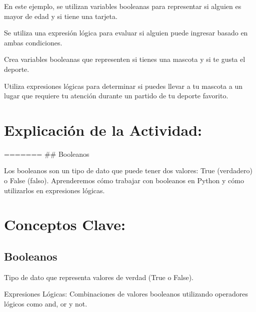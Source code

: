 \documentclass[
  a4paper,
  DIV=11,
  numbers=noendperiod,
  onepage,
  openany]{scrreprt}
\begin{document}
En este ejemplo, se utilizan variables booleanas para representar si
alguien es mayor de edad y si tiene una tarjeta.

Se utiliza una expresión lógica para evaluar si alguien puede ingresar
basado en ambas condiciones.

\begin{tcolorbox}[enhanced jigsaw, colbacktitle=quarto-callout-important-color!10!white, toprule=.15mm, leftrule=.75mm, titlerule=0mm, opacityback=0, rightrule=.15mm, opacitybacktitle=0.6, breakable, left=2mm, coltitle=black, title=\textcolor{quarto-callout-important-color}{\faExclamation}\hspace{0.5em}{Actividad Práctica:}, toptitle=1mm, bottomtitle=1mm, arc=.35mm, bottomrule=.15mm, colback=white, colframe=quarto-callout-important-color-frame]

Crea variables booleanas que representen si tienes una mascota y si te
gusta el deporte.

Utiliza expresiones lógicas para determinar si puedes llevar a tu
mascota a un lugar que requiere tu atención durante un partido de tu
deporte favorito.

\end{tcolorbox}

\hypertarget{explicaciuxf3n-de-la-actividad-24}{%
\section{Explicación de la
Actividad:}\label{explicaciuxf3n-de-la-actividad-24}}

======= \#\# Booleanos

Los booleanos son un tipo de dato que puede tener dos valores: True
(verdadero) o False (falso). Aprenderemos cómo trabajar con booleanos en
Python y cómo utilizarlos en expresiones lógicas.

\hypertarget{conceptos-clave-27}{%
\section{Conceptos Clave:}\label{conceptos-clave-27}}

\hypertarget{booleanos-2}{%
\subsection{Booleanos}\label{booleanos-2}}

Tipo de dato que representa valores de verdad (True o False).

Expresiones Lógicas: Combinaciones de valores booleanos utilizando
operadores lógicos como and, or y not.
\end{document}
